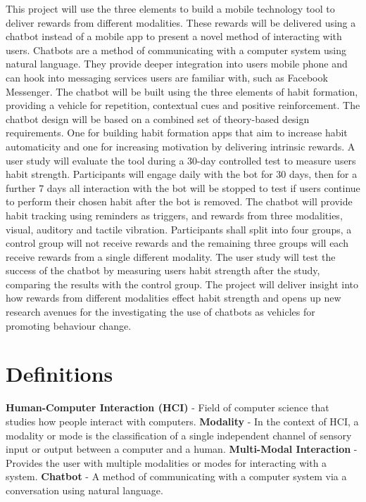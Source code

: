 \newline
This project will use the three elements to build a mobile technology tool to deliver rewards from different modalities. These rewards will be delivered using a chatbot instead of a mobile app to present a novel method of interacting with users. Chatbots are a method of communicating with a computer system using natural language. They provide deeper integration into users mobile phone and can hook into messaging services users are familiar with, such as Facebook Messenger. The chatbot will be built using the three elements of habit formation, providing a vehicle for repetition, contextual cues and positive reinforcement.\newline
\newline
The chatbot design will be based on a combined set of theory-based design requirements. One for building habit formation apps that aim to increase habit automaticity and one for increasing motivation by delivering intrinsic rewards.\newline
\newline
A user study will evaluate the tool during a 30-day controlled test to measure users habit strength. Participants will engage daily with the bot for 30 days, then for a further 7 days all interaction with the bot will be stopped to test if users continue to perform their chosen habit after the bot is removed. The chatbot will provide habit tracking using reminders as triggers, and rewards from three modalities, visual, auditory and tactile vibration. Participants shall split into four groups, a control group will not receive rewards and the remaining three groups will each receive rewards from a single different modality. The user study will test the success of the chatbot by measuring users habit strength after the study, comparing the results with the control group.\newline
\newline
The project will deliver insight into how rewards from different modalities effect habit strength and opens up new research avenues for the investigating the use of chatbots as vehicles for promoting behaviour change.

\newpage

\section*{Definitions}

\textbf{Human-Computer Interaction (HCI)} - Field of computer science that studies how people interact with computers.\newline
\newline
\textbf{Modality} - In the context of HCI, a modality or mode is the classification of a single independent channel of sensory input or output between a computer and a human.\newline
\newline
\textbf{Multi-Modal Interaction} - Provides the user with multiple modalities or modes for interacting with a system.\newline
\newline
\textbf{Chatbot} - A method of communicating with a computer system via a conversation using natural language.

\newpage
